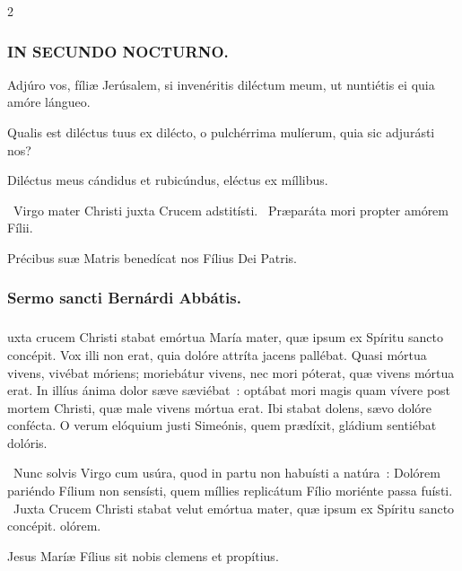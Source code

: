 \documentclass[9pt,twoside]{extarticle}
\begin{document}
\begin{multicols}{2}
\subsubsection*{\center \textsc{IN SECUNDO NOCTURNO.}}
\begin{tightlist}{}
\item {} Adjúro vos, fíliæ Jerúsalem, si invenéritis diléctum meum, ut nuntiétis ei quia amóre lángueo.
\item {} Qualis est diléctus tuus ex dilécto, o pulchérrima mulíerum, quia sic adjurásti nos?
\item {} Diléctus meus cándidus et rubicúndus, eléctus ex míllibus.
\item {}~Virgo mater Christi juxta Crucem adstitísti. ~Præparáta mori propter amórem Fílii.
\item {\small {} Précibus suæ Matris benedícat nos Fílius Dei Patris.}
\end{tightlist}

\subsubsection*{\center Sermo sancti Bernárdi Abbátis.}
\subsubsection*{\center {}}
uxta crucem Christi stabat emórtua María mater, quæ ipsum ex Spíritu sancto concépit. Vox illi non erat, quia dolóre attríta jacens pallébat. Quasi mórtua vivens, vivébat móriens; moriebátur vivens, nec mori póterat, quæ vivens mórtua erat. In illíus ánima dolor sæve sæviébat~: optábat mori magis quam vívere post mortem Christi, quæ male vivens mórtua erat. Ibi stabat dolens, sævo dolóre confécta. O verum elóquium justi Simeónis, quem prædíxit, gládium sentiébat dolóris.

\begin{tightlist}{}
\item {}~Nunc solvis Virgo cum usúra, quod in partu non habuísti a natúra~: \textred{*} Dolórem pariéndo Fílium non sensísti, quem míllies replicátum Fílio moriénte passa fuísti. ~Juxta Crucem Christi stabat velut emórtua mater, quæ ipsum ex Spíritu sancto concépit. olórem.
\item {\small {} Jesus Maríæ Fílius sit nobis clemens et propítius.}
\end{tightlist}


\end{multicols}
\end{document}

